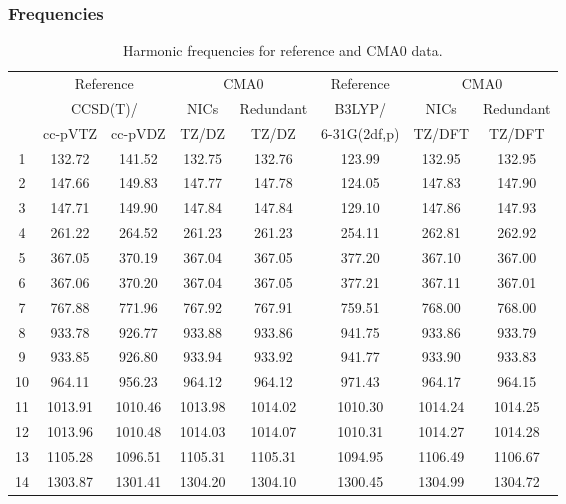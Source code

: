 \documentclass[10pt,oneside]{article}
\begin{document}
\begin{table}[h!]
\subsubsection*{Frequencies}
\centering
\caption{Harmonic frequencies for reference and CMA0 data.}
\begin{tabular}{cccccccc}
\toprule
{} & \multicolumn{2}{c}{Reference} & \multicolumn{2}{c}{CMA0} &    Reference & \multicolumn{2}{c}{CMA0} \\
{} & \multicolumn{2}{c}{CCSD(T)/} &    NICs &  Redundant &       B3LYP/ &    NICs & Redundant \\
{} &   cc-pVTZ & cc-pVDZ &   TZ/DZ &      TZ/DZ & 6-31G(2df,p) &  TZ/DFT &    TZ/DFT \\
\midrule
1  &    132.72 &  141.52 &  132.75 &     132.76 &       123.99 &  132.95 &    132.95 \\
2  &    147.66 &  149.83 &  147.77 &     147.78 &       124.05 &  147.83 &    147.90 \\
3  &    147.71 &  149.90 &  147.84 &     147.84 &       129.10 &  147.86 &    147.93 \\
4  &    261.22 &  264.52 &  261.23 &     261.23 &       254.11 &  262.81 &    262.92 \\
5  &    367.05 &  370.19 &  367.04 &     367.05 &       377.20 &  367.10 &    367.00 \\
6  &    367.06 &  370.20 &  367.04 &     367.05 &       377.21 &  367.11 &    367.01 \\
7  &    767.88 &  771.96 &  767.92 &     767.91 &       759.51 &  768.00 &    768.00 \\
8  &    933.78 &  926.77 &  933.88 &     933.86 &       941.75 &  933.86 &    933.79 \\
9  &    933.85 &  926.80 &  933.94 &     933.92 &       941.77 &  933.90 &    933.83 \\
10 &    964.11 &  956.23 &  964.12 &     964.12 &       971.43 &  964.17 &    964.15 \\
11 &   1013.91 & 1010.46 & 1013.98 &    1014.02 &      1010.30 & 1014.24 &   1014.25 \\
12 &   1013.96 & 1010.48 & 1014.03 &    1014.07 &      1010.31 & 1014.27 &   1014.28 \\
13 &   1105.28 & 1096.51 & 1105.31 &    1105.31 &      1094.95 & 1106.49 &   1106.67 \\
14 &   1303.87 & 1301.41 & 1304.20 &    1304.10 &      1300.45 & 1304.99 &   1304.72 \\

\end{tabular}
\end{table}
\end{document}

